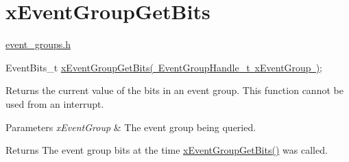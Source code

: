 \hypertarget{group__x_event_group_get_bits}{}\section{x\+Event\+Group\+Get\+Bits}
\label{group__x_event_group_get_bits}
\mbox{\hyperlink{event__groups_8h}{event\+\_\+groups.\+h}} 
\begin{DoxyPre}
   EventBits\_t \mbox{\hyperlink{event__groups_8h_a0ae86f092fb07ccb475ae938f9a12584}{xEventGroupGetBits( EventGroupHandle\_t xEventGroup )}};
\end{DoxyPre}


Returns the current value of the bits in an event group. This function cannot be used from an interrupt.


\begin{DoxyParams}{Parameters}
{\em x\+Event\+Group} & The event group being queried.\\
\hline
\end{DoxyParams}
\begin{DoxyReturn}{Returns}
The event group bits at the time \mbox{\hyperlink{event__groups_8h_a0ae86f092fb07ccb475ae938f9a12584}{x\+Event\+Group\+Get\+Bits()}} was called. 
\end{DoxyReturn}
